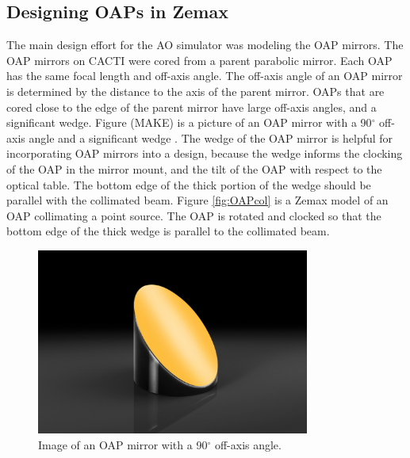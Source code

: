 
\subsection{Designing OAPs in Zemax}
The main design effort for the AO simulator was modeling the OAP mirrors. The OAP mirrors on CACTI were cored from a parent parabolic mirror. Each OAP has the same focal length and off-axis angle. The off-axis angle of an OAP mirror is determined by the distance to the axis of the parent mirror. OAPs that are cored close to the edge of the parent mirror have large off-axis angles, and a significant wedge. Figure (MAKE) is a picture of an OAP mirror with a 90$^{\circ}$ off-axis angle and a significant wedge \citep{edmundoptic}. The wedge of the OAP mirror is helpful for incorporating OAP mirrors into a design, because the wedge informs the clocking of the OAP in the mirror mount, and the tilt of the OAP with respect to the optical table. The bottom edge of the thick portion of the wedge should be parallel with the collimated beam. Figure \ref{fig:OAPcol} is a Zemax model of an OAP collimating a point source. The OAP is rotated and clocked so that the bottom edge of the thick wedge is parallel to the collimated beam. 

\begin{figure}
    \centering
    \includegraphics[width=0.8\textwidth]{Chapter Materials/Chapter Five Materials/OAP.png}
    \caption{Image of an OAP mirror with a 90$^{\circ}$ off-axis angle.}
    \label{fig:my_label}
\end{figure}


